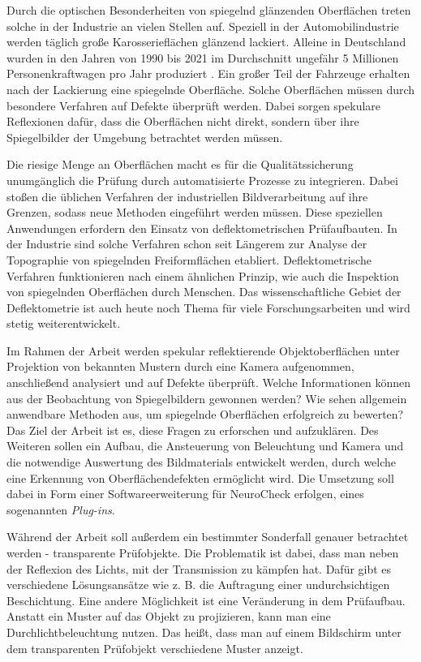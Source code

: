 Durch die optischen Besonderheiten von spiegelnd glänzenden Oberflächen treten solche in der Industrie an vielen Stellen auf.
Speziell in der Automobilindustrie werden täglich große Karosserieflächen glänzend lackiert.
Alleine in Deutschland wurden in den Jahren von 1990 bis 2021 im Durchschnitt ungefähr 5 Millionen Personenkraftwagen pro Jahr produziert \cite{statistaPKW}.
Ein großer Teil der Fahrzeuge erhalten nach der Lackierung eine spiegelnde Oberfläche.
Solche Oberflächen müssen durch besondere Verfahren auf Defekte überprüft werden.
Dabei sorgen spekulare Reflexionen dafür, dass die Oberflächen nicht direkt, sondern über ihre Spiegelbilder der Umgebung betrachtet werden müssen. %

\p
Die riesige Menge an Oberflächen macht es für die Qualitätssicherung unumgänglich die Prüfung durch automatisierte Prozesse zu integrieren.
Dabei stoßen die üblichen Verfahren der industriellen Bildverarbeitung auf ihre Grenzen, sodass neue Methoden eingeführt werden müssen.
Diese speziellen Anwendungen erfordern den Einsatz von deflektometrischen Prüfaufbauten.
In der Industrie sind solche Verfahren schon seit Längerem zur Analyse der Topographie von spiegelnden Freiformflächen etabliert.
Deflektometrische Verfahren funktionieren nach einem ähnlichen Prinzip, wie auch die Inspektion von spiegelnden Oberflächen durch Menschen. %
Das wissenschaftliche Gebiet der Deflektometrie ist auch heute noch Thema für viele Forschungsarbeiten und wird stetig weiterentwickelt.

\p
Im Rahmen der Arbeit werden spekular reflektierende Objektoberflächen unter Projektion von bekannten Mustern durch eine Kamera aufgenommen, anschließend analysiert und auf Defekte überprüft.
Welche Informationen können aus der Beobachtung von Spiegelbildern gewonnen werden?
Wie sehen allgemein anwendbare Methoden aus, um spiegelnde Oberflächen erfolgreich zu bewerten?
Das Ziel der Arbeit ist es, diese Fragen zu erforschen und aufzuklären.
Des Weiteren sollen ein Aufbau, die Ansteuerung von Beleuchtung und Kamera und die notwendige Auswertung des Bildmaterials entwickelt werden, durch welche eine Erkennung von Oberflächendefekten ermöglicht wird.
Die Umsetzung soll dabei in Form einer Softwareerweiterung für NeuroCheck erfolgen, eines sogenannten \textit{Plug-ins}.

\p
Während der Arbeit soll außerdem ein bestimmter Sonderfall genauer betrachtet werden - transparente Prüfobjekte.
Die Problematik ist dabei, dass man neben der Reflexion des Lichts, mit der Transmission zu kämpfen hat.
Dafür gibt es verschiedene Lösungsansätze wie z. B. die Auftragung einer undurchsichtigen Beschichtung.
Eine andere Möglichkeit ist eine Veränderung in dem Prüfaufbau.
Anstatt ein Muster auf das Objekt zu projizieren, kann man eine Durchlichtbeleuchtung nutzen.
Das heißt, dass man auf einem Bildschirm unter dem transparenten Prüfobjekt verschiedene Muster anzeigt.

